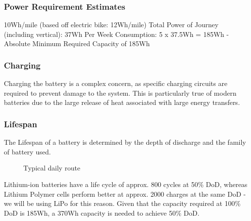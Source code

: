 \documentclass[journal,10pt]{IEEEtran}
\begin{document}
        \subsubsection{Power Requirement Estimates}
            10Wh/mile (based off electric bike: 12Wh/mile)
            Total Power of Journey (including vertical): 37Wh
            Per Week Consumption: 5 x 37.5Wh = 185Wh
            -Absolute Minimum Required Capacity of 185Wh
        \subsubsection{Charging}
            Charging the battery is a complex concern, as specific charging circuits are required to prevent damage to the system. This is particularly true of modern batteries due to the large release of heat associated with large energy transfers.
        \subsubsection{Lifespan}
            The Lifespan of a battery is determined by the depth of discharge and the family of battery used.
            \begin{figure}[H]
                \centering
                \caption{Typical daily route}
                \label{fig:route}
            \end{figure}
            Lithium-ion batteries have a life cycle of approx. 800 cycles at 50\% DoD, whereas Lithium Polymer cells perform better at approx. 2000 charges at the same DoD - we will be using LiPo for this reason. Given that the capacity required at 100\% DoD is 185Wh, a 370Wh capacity is needed to achieve 50\% DoD.
\end{document}

